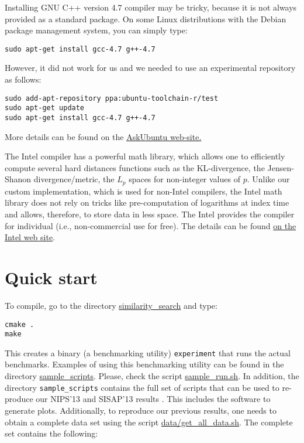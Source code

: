 \documentclass[runningheads,a4paper]{llncs}
\newcommand{\ttt}[1]{\texttt{#1}}
\begin{document}
Installing GNU C++ version 4.7 compiler may be tricky, because it is not always provided as a standard package.
On some Linux distributions with the Debian package management system, you can simply type:
\begin{verbatim}
sudo apt-get install gcc-4.7 g++-4.7
\end{verbatim}
However, it did not work for us and we needed to use an experimental repository as follows:
\begin{verbatim}
sudo add-apt-repository ppa:ubuntu-toolchain-r/test
sudo apt-get update
sudo apt-get install gcc-4.7 g++-4.7
\end{verbatim}
More details can be found on the \href{http://askubuntu.com/questions/113291/how-do-i-install-gcc-4-7}{AskUbuntu web-site.}

The Intel compiler has a powerful math library, 
which allows one to efficiently compute several hard distances functions
such as the KL-divergence, the Jensen-Shanon divergence/metric, 
the $L_p$ spaces for non-integer values of $p$.
Unlike our custom implementation, which is used for non-Intel compilers,
the Intel math library does not rely on tricks like pre-computation of logarithms at index time and
allows, therefore, to store data in less space. 
The Intel provides the compiler for individual (i.e., non-commercial use for free).
The details can be found \href{http://software.intel.com/en-us/non-commercial-software-development}{on the Intel web site}.


\section{Quick start}
To compile, go to the directory \href{https://github.com/searchivarius/NonMetricSpaceLib/tree/master/similarity_search}{similarity\_search} and type:  
\begin{verbatim}
cmake .  
make   
\end{verbatim}
This creates a binary (a benchmarking utility) \ttt{experiment} that runs the actual benchmarks. 
Examples of using this benchmarking utility can be found in the directory \href{https://github.com/searchivarius/NonMetricSpaceLib/tree/master/sample_scripts}{sample\_scripts}. 
Please, check the script \href{https://github.com/searchivarius/NonMetricSpaceLib/tree/master/sample_scripts/sample_run.sh}{sample\_run.sh}. 
In addition, the directory \ttt{sample\_scripts} contains the full set of scripts that can be used to re-produce our NIPS'13 and SISAP'13 results \cite{Boytsov_and_Bilegsaikhan:sisap2013,Boytsov_and_Bilegsaikhan:nips2013}.
This includes the software to generate plots. 
Additionally, to reproduce our previous results, one needs to obtain a complete data set using the script \href{https://github.com/searchivarius/NonMetricSpaceLib/tree/master/data/get_all_data.sh}{data/get\_all\_data.sh}. 
The complete set contains the following:
\end{document}
